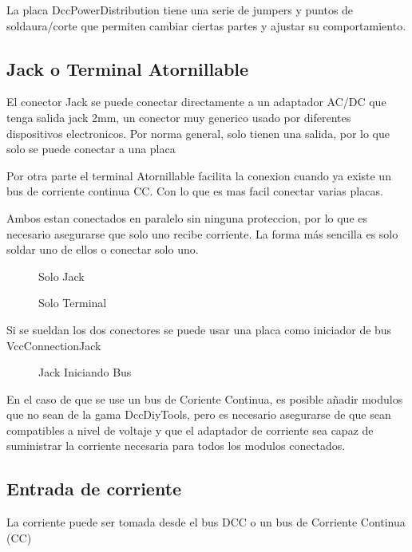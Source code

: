 
La placa DccPowerDistribution tiene una serie de jumpers y puntos de soldaura/corte
que permiten cambiar ciertas partes y ajustar su comportamiento.

\subsection{Jack o Terminal Atornillable}

El conector Jack se puede conectar directamente a un adaptador AC/DC que tenga salida 
jack 2mm, un conector muy generico usado por diferentes dispositivos electronicos.
Por norma general, solo tienen una salida, por lo que solo se puede conectar a una placa

Por otra parte el terminal Atornillable facilita la conexion cuando ya existe un bus de
corriente continua CC. Con lo que es mas facil conectar varias placas.

Ambos estan conectados en paralelo sin ninguna proteccion, por lo que es necesario
asegurarse que solo uno recibe corriente. La forma más sencilla es solo soldar uno 
de ellos o conectar solo uno.

\begin{figure}[H]
    \centering
    \begin{minipage}{0.25\textwidth}
        \centering
        
        \caption{Solo Jack}
        \label{fig:VccConnectionJack}
    \end{minipage}
    \hfill
    \begin{minipage}{0.7\textwidth}
        \centering
        
        \caption{Solo Terminal}
        \label{fig:VccConnectionTerminal}
    \end{minipage}
\end{figure}

Si se sueldan los dos conectores se puede usar una placa como iniciador de bus VccConnectionJack

\begin{figure}[H]
    \centering
    
    \caption{Jack Iniciando Bus}
    \label{fig:VccConnectionJackBus}
\end{figure}

En el caso de que se use un bus de Coriente Continua, es posible añadir modulos que no sean
de la gama DccDiyTools, pero es necesario asegurarse de que sean compatibles a nivel de voltaje
y que el adaptador de corriente sea capaz de suministrar la corriente necesaria para todos los
modulos conectados.

\subsection{Entrada de corriente}
La corriente puede ser tomada desde el bus DCC o un bus de Corriente Continua (CC)